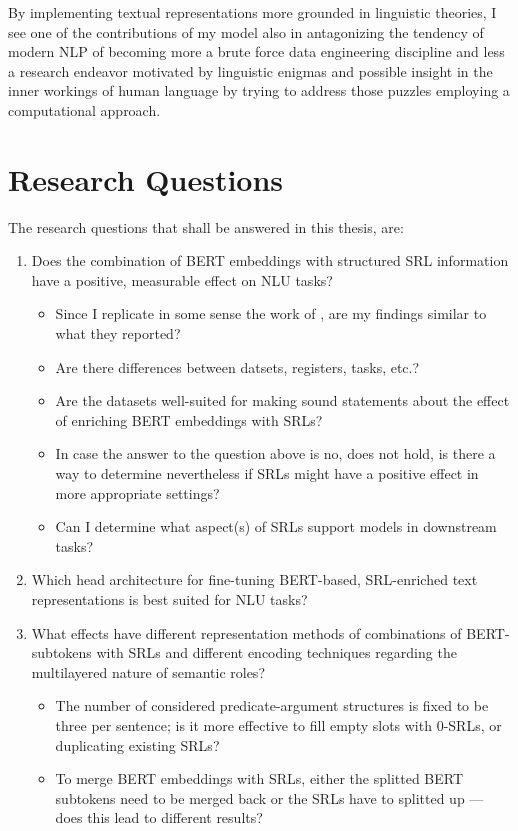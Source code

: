 By implementing textual representations more grounded in linguistic theories, I see one of
the contributions of my model also in antagonizing the tendency of modern NLP of becoming
more a brute force data engineering discipline and less a research endeavor motivated by
linguistic enigmas and possible insight in the inner workings of human language by trying
to address those puzzles employing a computational approach.


\section{Research Questions}

The research questions that shall be answered in this thesis, are:

\begin{enumerate}
  \item \label{ques:one} Does the combination of  BERT embeddings with structured SRL information have a positive,
                         measurable effect on NLU tasks?
    \begin{itemize}
      \item Since I replicate in some sense the work of \cite{zhang2019semantics}, are my findings similar to what they reported?
      \item Are there differences between datsets, registers, tasks, etc.?
      \item Are the datasets well-suited for making sound statements about the effect of enriching BERT embeddings with SRLs?
      \item In case the answer to the question above is no, does not hold, is there a way to determine nevertheless if SRLs might have a positive effect in more appropriate settings?
      \item Can I determine what aspect(s) of SRLs support models in downstream tasks?
    \end{itemize}
  \item \label{ques:two} Which head architecture for fine-tuning BERT-based, SRL-enriched text representations is best suited for
                          NLU tasks?
  \item \label{ques:three} What effects have different representation methods of combinations of BERT-subtokens with SRLs and different encoding techniques regarding the multilayered nature of semantic roles?
    \begin{itemize}
      \item The number of considered predicate-argument
            structures is fixed to be three per sentence; is it more effective to fill empty slots with
            0-SRLs, or duplicating existing SRLs?
      \item To merge BERT embeddings with SRLs, either
            the splitted BERT subtokens need to be merged back or the SRLs have to splitted up --- does
            this lead to different results?
    \end{itemize}

\end{enumerate}



